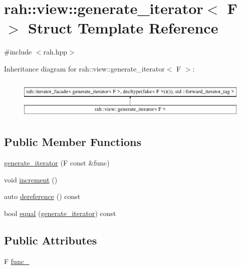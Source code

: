 \hypertarget{structrah_1_1view_1_1generate__iterator}{}\section{rah\+::view\+::generate\+\_\+iterator$<$ F $>$ Struct Template Reference}
\label{structrah_1_1view_1_1generate__iterator}


{\ttfamily \#include $<$rah.\+hpp$>$}

Inheritance diagram for rah\+::view\+::generate\+\_\+iterator$<$ F $>$\+:\begin{figure}[H]
\begin{center}
\leavevmode
\includegraphics[height=1.958042cm]{structrah_1_1view_1_1generate__iterator}
\end{center}
\end{figure}
\subsection*{Public Member Functions}
\begin{DoxyCompactItemize}
\item 
\mbox{\hyperlink{structrah_1_1view_1_1generate__iterator_a407696209d96fe38234970a91d23e35f}{generate\+\_\+iterator}} (F const \&func)
\item 
void \mbox{\hyperlink{structrah_1_1view_1_1generate__iterator_aeb0fc0db74bda811fe5d7cb8c6efe1e0}{increment}} ()
\item 
auto \mbox{\hyperlink{structrah_1_1view_1_1generate__iterator_ab7b0cf4a8f45cfd67278935bd9a39c13}{dereference}} () const
\item 
bool \mbox{\hyperlink{structrah_1_1view_1_1generate__iterator_acd6b1f8f7d75f1106a6046b3baee4796}{equal}} (\mbox{\hyperlink{structrah_1_1view_1_1generate__iterator}{generate\+\_\+iterator}}) const
\end{DoxyCompactItemize}
\subsection*{Public Attributes}
\begin{DoxyCompactItemize}
\item 
F \mbox{\hyperlink{structrah_1_1view_1_1generate__iterator_a72f19774c5fddd0a04a293bd08dce1cd}{func\+\_\+}}
\end{DoxyCompactItemize}


